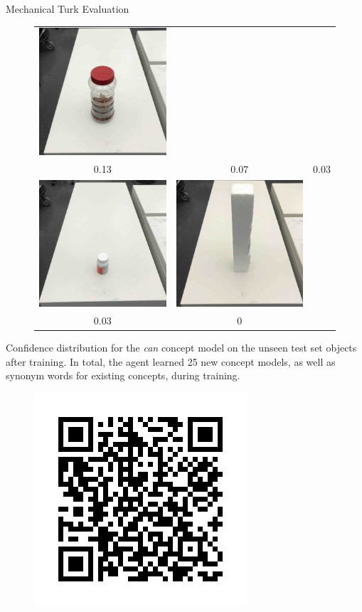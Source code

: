 \documentclass[final]{beamer}
\newcommand{\setblocksize}{\Large \centering}
\begin{document}
\begin{frame}{}
\begin{columns}[t]
\begin{column}{0.24\linewidth}
\begin{block}{\setblocksize Mechanical Turk Evaluation}
{\begin{figure}
\begin{tabular}[t!]{ccc}
  \includegraphics[width=0.3\linewidth]{figures/oidx_22.jpg} \\
  0.13 & 0.07 & 0.03 \\
  \includegraphics[width=0.3\linewidth]{figures/oidx_6.jpg} &
  \includegraphics[width=0.3\linewidth]{figures/oidx_28.jpg} \\
  0.03 & 0 \\
\end{tabular}
\end{figure}
Confidence distribution for the \emph{can} concept model on the unseen test set objects after training.
In total, the agent learned 25 new concept models, as well as synonym words for existing concepts, during training.

\begin{figure}
\centering
  \includegraphics[width=0.7\linewidth]{QR.png}
\end{figure}

}
\end{block}
\end{column}
\end{columns}
\end{frame}
\end{document}

